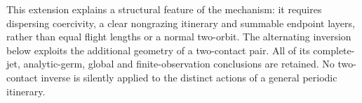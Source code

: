 This extension explains a structural feature of the mechanism: it
requires dispersing coercivity, a clear nongrazing itinerary and summable
endpoint layers, rather than equal flight lengths or a normal two-orbit.
The alternating inversion below exploits the additional geometry of a
two-contact pair.  All of its complete-jet, analytic-germ, global and finite-observation
conclusions are retained.  No two-contact inverse is silently applied to
the distinct actions of a general periodic itinerary.
